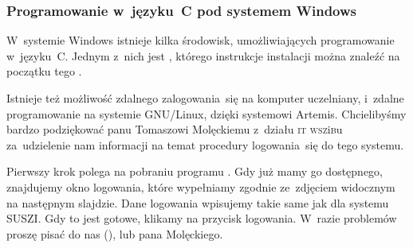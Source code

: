 \documentclass[10pt,t]{beamer}
\begin{document}
\begin{frame}
  \frametitle{Programowanie w~języku~C pod systemem Windows}


  W~systemie Windows istnieje kilka środowisk, umożliwiających programowanie
  w~języku~C. Jednym z~nich jest
  , którego instrukcje
  instalacji można znaleźć na początku tego
  \parencite{freeCodeCamp-org-C-Programming-Tutorial-for-ETC-Ver-2018}.

  Istnieje też możliwość zdalnego zalogowania~się na komputer uczelniany,
  i~zdalne programowanie na systemie GNU/Linux, dzięki systemowi Artemis.
  Chcielibyśmy bardzo podziękować panu Tomaszowi Molęckiemu z~działu
  \textsc{it} \textsc{wsz}i\textsc{b}u za~udzielenie nam informacji na temat
  procedury logowania~się do tego systemu.

  Pierwszy krok polega na pobraniu programu
  . Gdy
  już mamy go dostępnego, znajdujemy okno logowania, które wypełniamy
  zgodnie ze~zdjęciem widocznym na następnym slajdzie. Dane logowania
  wpisujemy takie same jak dla systemu SUSZI. Gdy to jest gotowe, klikamy
  na przycisk logowania. W~razie problemów proszę pisać do nas (\email),
  lub pana Molęckiego.

\end{frame}
\end{document}
